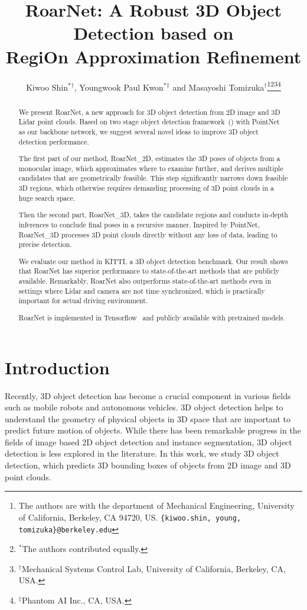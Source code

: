\documentclass[letterpaper, 10 pt, conference]{ieeeconf}
\title{\LARGE \bf
RoarNet: A Robust 3D Object Detection based on \\
RegiOn Approximation Refinement
}
\author{Kiwoo Shin$^{*}$$^\dagger$, Youngwook Paul Kwon$^{*}$$^\ddagger$ and Masayoshi Tomizuka$^\dagger$\thanks{The authors are with the department of Mechanical Engineering, University of California, Berkeley, CA 94720, US. {\tt\footnotesize \{kiwoo.shin, young, tomizuka\}@berkeley.edu}}\thanks{$^{*}$The authors contributed equally.}\thanks{$^\dagger$Mechanical Systems Control Lab, University of California, Berkeley, CA, USA.}\thanks{$^\ddagger$Phantom AI Inc., CA, USA.}}
\begin{document}
\maketitle
\thispagestyle{empty}
\pagestyle{empty}


\begin{abstract}
We present RoarNet, a new approach for 3D object detection from 2D image and 3D Lidar point clouds.
Based on two stage object detection framework~(\cite{girshick_fast_2015, ren_faster_2015}) with PointNet~\cite{qi_pointnet_2017} as our backbone network, we suggest several novel ideas to improve 3D object detection performance.

The first part of our method, RoarNet\_2D, estimates the 3D poses of objects from a monocular image, which approximates where to examine further, and derives multiple candidates that are geometrically feasible. This step significantly narrows down feasible 3D regions, which otherwise requires demanding processing of 3D point clouds in a huge search space.

Then the second part, RoarNet\_3D, takes the candidate regions and conducts in-depth inferences to conclude final poses in a recursive manner. Inspired by PointNet, RoarNet\_3D processes 3D point clouds directly without any loss of data, leading to precise detection.


We evaluate our method in KITTI, a 3D object detection benchmark. Our result shows that RoarNet has superior performance to state-of-the-art methods that are publicly available.
Remarkably, RoarNet also outperforms state-of-the-art methods even in settings where Lidar and camera are not time synchronized, which is practically important for actual driving environment.

RoarNet is implemented in Tensorflow~\cite{Abadi:2016:TSL:3026877.3026899} and publicly available with pretrained models.
\end{abstract}




\section{Introduction}


Recently, 3D object detection has become a crucial component in various fields such as mobile robots and autonomous vehicles. 3D object detection helps to understand the geometry of physical objects in 3D space that are important to predict future motion of objects. While there has been remarkable progress in the fields of image based 2D object detection and instance segmentation, 3D object detection is less explored in the literature. In this work, we study 3D object detection, which predicts 3D bounding boxes of objects from 2D image and 3D point clouds.
\end{document}
